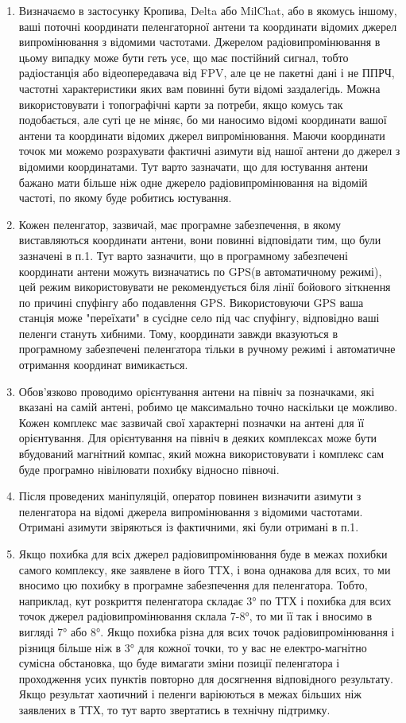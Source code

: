 \documentclass{article}
\begin{document}
\begin{enumerate}[noitemsep, topsep=8pt]
	\item Визначаємо в застосунку Кропива, Delta або MilChat, або в якомусь іншому, ваші поточні координати пеленгаторної антени та координати відомих джерел випромінювання з відомими частотами. Джерелом радіовипромінювання в цьому випадку може бути геть усе, що має постійний сигнал, тобто радіостанція або відеопередавача від FPV, але це не пакетні дані і не ППРЧ, частотні характеристики яких вам повинні бути відомі заздалегідь. Можна використовувати і топографічні карти за потреби, якщо комусь так подобається, але суті це не міняє, бо ми наносимо відомі координати вашої антени та координати відомих джерел випромінювання. Маючи координати точок ми можемо розрахувати фактичні азимути від нашої антени до джерел з відомими координатами. Тут варто зазначати, що для юстування антени бажано мати більше ніж одне джерело радіовипромінювання на відомій частоті, по якому буде робитись юстування.
	\item Кожен пеленгатор, зазвичай, має програмне забезпечення, в якому виставляються координати антени, вони повинні відповідати тим, що були зазначені в п.1. Тут варто зазначити, що в програмному забезпечені координати антени можуть визначатись по GPS(в автоматичному режимі), цей режим використовувати не рекомендується біля лінії бойового зіткнення по причині спуфінгу або подавлення GPS. Використовуючи GPS ваша станція може "переїхати" в сусідне село під час спуфінгу, відповідно ваші пеленги стануть хибними. Тому, координати завжди вказуються в програмному забезпечені пеленгатора тільки в ручному режимі і автоматичне отримання координат вимикається.
	\item Обов'язково проводимо орієнтування антени на північ за позначками, які вказані на самій антені, робимо це максимально точно наскільки це можливо. Кожен комплекс має зазвичай свої характерні позначки на антені для її орієнтування. Для орієнтування на північ в деяких комплексах може бути вбудований магнітний компас, який можна використовувати і комплекс сам буде програмно нівілювати похибку відносно півночі.
	\item Після проведених маніпуляцій, оператор повинен визначити азимути з пеленгатора на відомі джерела випромінювання з відомими частотами. Отримані азимути звіряються із фактичними, які були отримані в п.1. 
	\item Якщо похибка для всіх джерел радіовипромінювання буде в межах похибки самого комплексу, яке заявлене в його ТТХ, і вона однакова для всих, то ми вносимо цю похибку в програмне забезпечення для пеленгатора. Тобто, наприклад, кут розкриття пеленгатора складає 3° по ТТХ і похибка для всих точок джерел радіовипромінювання склала 7-8°, то ми її так і вносимо в вигляді 7° або 8°. Якщо похибка різна для всих точок радіовипромінювання і різниця більше ніж в 3° для кожної точки, то у вас не електро-магнітно сумісна обстановка, що буде вимагати зміни позиції пеленгатора і проходження усих пунктів повторно для досягнення відповідного результату. Якщо результат хаотичний і пеленги варіюються в межах більших ніж заявлених в ТТХ, то тут варто звертатись в технічну підтримку.
\end{enumerate}
\end{document}
